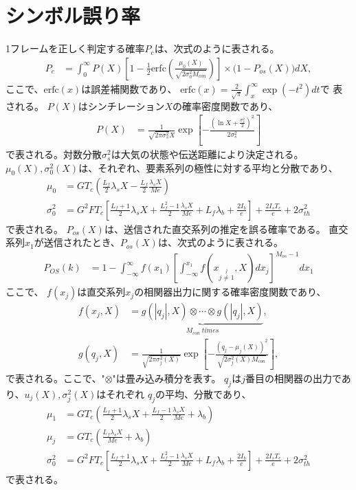 \section{シンボル誤り率}
1フレームを正しく判定する確率$P_c$は、次式のように表される。
\begin{align}
\label{Pc}
P_c&=\int_{0}^{\infty} P(X) \left[ 1 - \frac{1}{2} \mathrm{erfc} \left( \frac{\mu_0(X)}{\sqrt{2\sigma_0^2 M_{con}}} \right) \right] \times  \big(1-P_{os}(X)\big) dX,
\end{align}
ここで、$\mathrm{erfc}(x)$は誤差補関数であり、
$\mathrm{erfc}(x) = \frac{2}{\sqrt{\pi}} \int_x^{\infty} \exp(-t^2) dt$で
表される。
$P(X)$はシンチレーション$X$の確率密度関数であり、
\begin{align}
P(X)&=\frac{1}{\sqrt{2\pi \sigma_s^2}X} \exp\left[-\frac{\left(\ln X + \frac{\sigma_s^2}{2} \right)^2}{2\sigma_s^2} \right] \nonumber
\end{align}
で表される。対数分散$\sigma_s^2$は大気の状態や伝送距離により決定される。
$\mu_0(X), \sigma_0^2(X)$は、それぞれ、要素系列の極性に対する平均と分散であり、
\begin{align}
\mu_0&=GT_c \left( \frac{L_f}{2} \lambda_s X - \frac{L_f}{2}\frac{\lambda_s X}{Me} \right) \\
\sigma_0^2&=G^2 FT_c \left[ \frac{L_f+1}{2} \lambda_s X + \frac{L_f^2-1}{2} \frac{\lambda_s X}{Me} + L_f\lambda_b + \frac{2I_b}{e} \right] + \frac{2I_sT_c}{e} + 2\sigma_{th}^2 
\end{align}
で表される。
$P_{os}(X)$は、送信された直交系列の推定を誤る確率である。
直交系列$x_1$が送信されたとき、$P_{os}(X)$は、次式のように表される。
%
\begin{align}
P_{OS}(k)&=1 - \int_{-\infty}^{\infty} f(x_1) 
\left[ \int_{-\infty}^{x_1} f(x_{\stackrel{j}{j \neq 1}},X) dx_j \right]^{M_{os}-1} dx_1
\end{align}
%
ここで、 $f(x_j)$は直交系列$x_j$の相関器出力に関する確率密度関数であり、
\begin{align}
f(x_j,X)&=\underbrace{g(|q_j|,X) \otimes \cdots \otimes g(|q_j|,X)}_{M_{con}~times},  \\
g(q_j,X)&=\frac{1}{\sqrt{2 \pi \sigma_{j}^2(X)}} \exp \left[ -\frac{(q_j - \mu_j(X))^2}{\sqrt{2\sigma_{j}^2(X) M_{con}}} \right],
\end{align}
%
で表される。ここで、"$\otimes$"は畳み込み積分を表す。
$q_j$は$j$番目の相関器の出力であり、$u_j(X), \sigma_{j}^2(X)$はそれぞれ
$q_j$の平均、分散であり、
\begin{align}
\mu_1&=GT_c \left( \frac{L_f+1}{2} \lambda_s X + \frac{L_f-1}{2}\frac{\lambda_s X}{Me} + \lambda_b \right) \\
\mu_j&=GT_c \left( \frac{L_f \lambda_s X}{Me} + \lambda_b \right) \\
\sigma_0^2&=G^2 FT_c \left[ \frac{L_f+1}{2} \lambda_s X + \frac{L_f^2-1}{2} \frac{\lambda_s X}{Me} + L_f\lambda_b + \frac{2I_b}{e} \right] + \frac{2I_sT_c}{e} + 2\sigma_{th}^2 
\end{align}
で表される。

